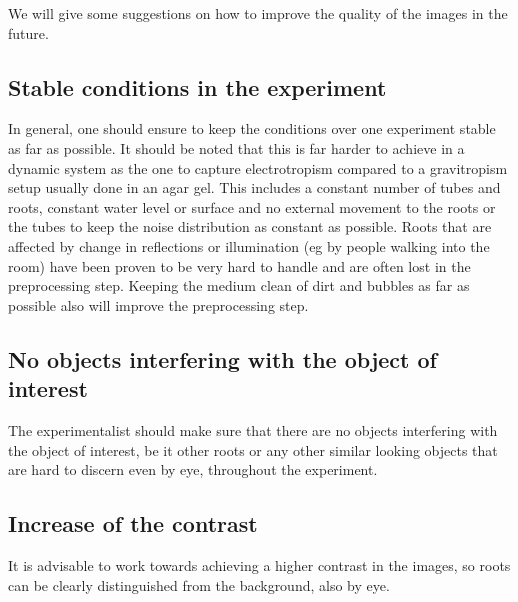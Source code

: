 We will give some suggestions on how to improve the quality of the images in the future.


\subsection{Stable conditions in the experiment}

In general, one should ensure to keep the conditions over one experiment stable as far as possible. It should be noted that this is far harder to achieve in a dynamic system as the one to capture electrotropism compared to a gravitropism setup usually done in an agar gel. 
This includes a constant number of tubes and roots, constant water level or surface and no external movement to the roots or the tubes to keep the noise distribution as constant as possible. Roots that are affected by change in reflections or illumination (eg by people walking into the room) have been proven to be very hard to handle and are often lost in the preprocessing step. 
Keeping the medium clean of dirt and bubbles as far as possible also will improve the preprocessing step. 


\subsection{No objects interfering with the object of interest}

The experimentalist should make sure that there are no objects interfering with the object of interest, be it other roots or any other similar looking objects that are hard to discern even by eye, throughout the experiment.



\subsection{Increase of the contrast}

It is advisable to work towards achieving a higher contrast in the images, so roots can be clearly distinguished from the background, also by eye.




